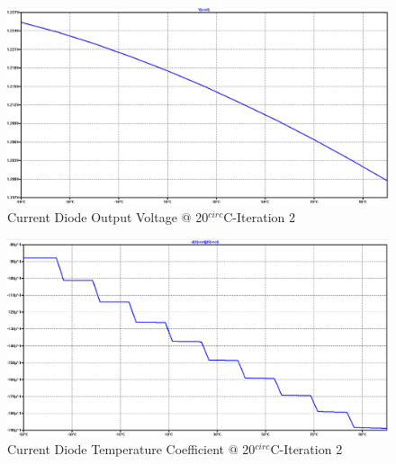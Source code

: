 \begin{figure}[!htbp]
  	\centering
  	\includegraphics[scale=0.15]{images/appendix/cd2-vref.png}
  	\caption[output-z-meas]{Current Diode Output Voltage @ 20$^{circ}$C-Iteration 2}
  	\label{fig:cd2-vref}
	\end{figure}
\begin{figure}[!htbp]
  	\centering
  	\includegraphics[scale=0.15]{images/appendix/cd2-tempco.png}
  	\caption[output-z-meas]{Current Diode Temperature Coefficient @ 20$^{circ}$C-Iteration 2}
  	\label{fig:cd2-tempco}
	\end{figure}

